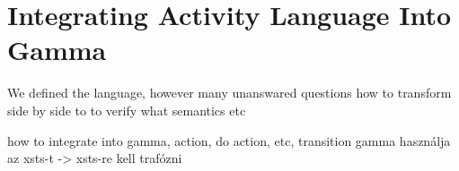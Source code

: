 \chapter{Integrating Activity Language Into Gamma}\label{ch:activiy_verification}

We defined the language, however many unanswared questions
how to transform side by side
to to verify
what semantics
etc

how to integrate into gamma, action, do action, etc, transition
gamma használja az xsts-t -> xsts-re kell trafózni




